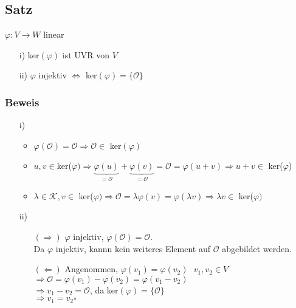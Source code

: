 \documentclass[12pt,titlepage, pdf]{article}
\newcommand{\K}{\mathcal{K}}
\newcommand{\qed}{\hfill$\square$}
\renewcommand{\>}{\rightarrow}
\renewcommand{\*}{\cdot}
\renewcommand{\O}{\mathcal{O}}
\renewcommand{\phi}{\varphi}
\begin{document}
		      			\subsection{Satz}
		      			\label{6.9}
		      			$\phi: V \rightarrow W$ linear
		      			\begin{itemize}
		      				\item[i)] ker$(\phi)$ ist UVR von $V$
		      				\item[ii)] $\phi$ injektiv $\Leftrightarrow$ ker$(\phi) = \{\O\}$
		      			\end{itemize}
		      			\subsubsection*{Beweis}
		      			\begin{itemize}
		      				\item[i)]
		      				      \begin{itemize}
		      				      	\item $\phi(\O) = \mathcal{O} \Rightarrow \mathcal{O} \in$ ker$(\phi)$
		      				      	\item $u,v \in $ker($\phi) \Rightarrow \underbrace{\phi(u)}_{= \O} + \underbrace{\phi(v)}_{=\O} = \O = \phi(u+v) \Rightarrow u+v \in $ ker($\phi$)
		      				      	\item $\lambda \in \K, v \in $ ker($\phi) \Rightarrow \O = \lambda \phi(v) = \phi(\lambda v) \Rightarrow \lambda v \in $ ker($\phi)$
		      				      \end{itemize}
		      				\item[ii)]
		      				      \begin{itemize}
		      				      	\item[$(\Rightarrow)$] $\phi$ injektiv, $\phi(\O) = \O$.\\ Da $\phi$ injektiv, kannn kein weiteres Element auf $\O$ abgebildet werden.
		      				      	\item[$(\Leftarrow)$] Angenommen, $\phi(v_1) = \phi(v_2)~~~ v_1, v_2 \in V$ \\
		      				      	      $\Rightarrow \O = \phi(v_1) - \phi(v_2) = \phi(v_1 - v_2)$ \\
		      				      	      $\Rightarrow v_1  - v_2 = \O$, da ker$(\phi) = \{\O\}$\\
		      				      	      $\Rightarrow v_1 = v_2 $\qed
		      				      \end{itemize}
		      			\end{itemize}
\end{document}
